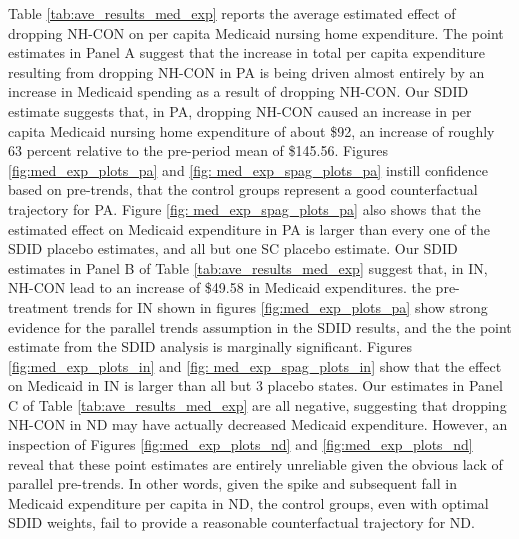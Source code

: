 \documentclass[../Main.tex]{subfiles}
\begin{document}
\indent Table \ref{tab:ave_results_med_exp} reports the average estimated effect of dropping NH-CON on per capita Medicaid nursing home expenditure. The point estimates in Panel A suggest that the increase in total per capita expenditure resulting from dropping NH-CON in PA is being driven almost entirely by an increase in Medicaid spending as a result of dropping NH-CON. Our SDID estimate suggests that, in PA, dropping NH-CON caused an increase in per capita Medicaid nursing home expenditure of about \$92, an increase of roughly 63 percent relative to the pre-period mean of \$145.56. Figures \ref{fig:med_exp_plots_pa} and \ref{fig: med_exp_spag_plots_pa} instill confidence based on pre-trends, that the control groups represent a good counterfactual trajectory for PA. Figure \ref{fig: med_exp_spag_plots_pa} also shows that the estimated effect on Medicaid expenditure in PA is larger than every one of the SDID placebo estimates, and all but one SC placebo estimate. Our SDID estimates in Panel B of Table \ref{tab:ave_results_med_exp} suggest that, in IN, NH-CON lead to an increase of \$49.58 in Medicaid expenditures. the pre-treatment trends for IN shown in figures \ref{fig:med_exp_plots_pa} show strong evidence for the parallel trends assumption in the SDID results, and the the point estimate from the SDID analysis is marginally significant. Figures \ref{fig:med_exp_plots_in} and \ref{fig: med_exp_spag_plots_in} show that the effect on Medicaid in IN is larger than all but 3 placebo states. Our estimates in Panel C of Table \ref{tab:ave_results_med_exp} are all negative, suggesting that dropping NH-CON in ND may have actually decreased Medicaid expenditure. However, an inspection of Figures \ref{fig:med_exp_plots_nd} and \ref{fig:med_exp_plots_nd} reveal that these point estimates are entirely unreliable given the obvious lack of parallel pre-trends. In other words, given the spike and subsequent fall in Medicaid expenditure per capita in ND, the control groups, even with optimal SDID weights, fail to provide a reasonable counterfactual trajectory for ND.
\end{document}
